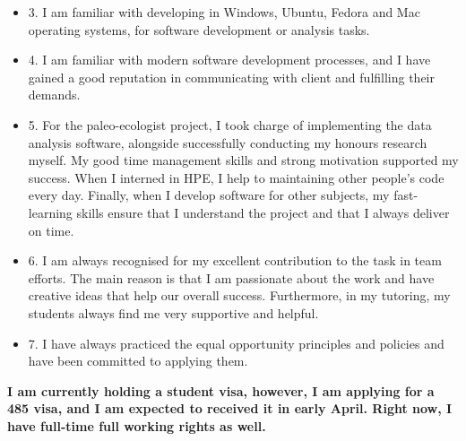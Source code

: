 \documentclass[11pt, a4paper]{awesome-cv}
\begin{document}
\begin{cvletter}
\begin{itemize}
\item 
3. I am familiar with developing in Windows, Ubuntu, Fedora and Mac operating systems, for software development or analysis tasks.
\item 
4. I am familiar with modern software development processes, and I have gained a good reputation in communicating with client and fulfilling their demands.
\item 
5. For the paleo-ecologist project, I took charge of implementing the data analysis software, alongside successfully conducting my honours research myself. My good time management skills and strong motivation supported my success. When I interned in HPE, I help to maintaining other people’s code every day. Finally, when I develop software for other subjects, my fast-learning skills ensure that I understand the project and that I always deliver on time.
\item 
6. I am always recognised for my excellent contribution to the task in team efforts. The main reason is that I am passionate about the work and have creative ideas that help our overall success. Furthermore, in my tutoring, my students always find me very supportive and helpful.
\item 
7. I have always practiced the equal opportunity principles and policies and have been committed to applying them.
\end{itemize}

\textbf{I am currently holding a student visa, however, I am applying for a 485 visa, and I am expected to received it in early April. Right now, I have full-time full working rights as well.}
\end{cvletter}


\makeletterclosing
\end{document}
